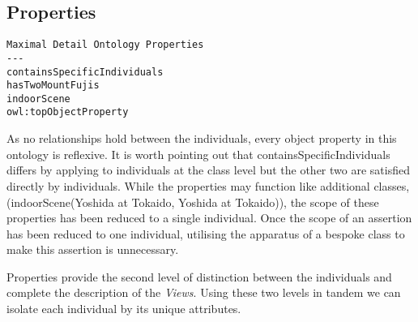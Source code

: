 \documentclass[titlepage,a4paper,12pt,oneside]{book}
\begin{document}
\subsection{Properties}
\begin{lstlisting}
Maximal Detail Ontology Properties
---
containsSpecificIndividuals
hasTwoMountFujis
indoorScene
owl:topObjectProperty
\end{lstlisting}
As no relationships hold between the individuals, every object property in this ontology is reflexive.
It is worth pointing out that containsSpecificIndividuals differs by applying to individuals at the class level but the other two are satisfied directly by individuals.
While the properties may function like additional classes, (indoorScene(Yoshida at Tokaido, Yoshida at Tokaido)), the scope of these properties has been reduced to a single individual.
Once the scope of an assertion has been reduced to one individual, utilising the apparatus of a bespoke class to make this assertion is unnecessary.\par
Properties provide the second level of distinction between the individuals and complete the description of the \textit{Views}.
Using these two levels in tandem we can isolate each individual by its unique attributes.
\end{document}
